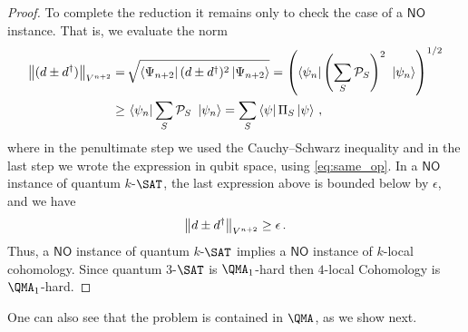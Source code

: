 \documentclass[11pt]{article}
\numberwithin{equation}{section}
\def\cP{{\cal P}}
\newcommand{\no}{\mathsf{NO}}
\newcommand\equ[1] {\begin{equation}#1\end{equation}}
\newcommand\eqss[1] {\begin{align}\begin{split}#1\end{split}\end{align}}
\renewcommand\( {\left(}
\renewcommand\) {\right)}
\begin{document}
\begin{proof}
To complete the reduction it remains only to check the case of a $\no$ instance. That is, we evaluate the norm
\eqss{
\norm{(d\pm d^{\dagger})}_{V^{n+2}}=\,& \sqrt{ \bra{\Psi_{n+2}}(d\pm d^{\dagger})^{2} \ket{\Psi_{n+2}}}= \left( \bra{\psi_{n}} \left(\sum_{S}\cP_{S}\right)^{2}\ \ket{\psi_{n}}\right)^{1/2} \\
\geq \,&  \bra{\psi_{n}} \sum_{S}\cP_{S}\ \ket{\psi_{n}}=\sum_{S}\bra{\psi}\Pi_{S}\ket{\psi}\,,
}
where in the penultimate step we used the Cauchy–Schwarz inequality and in the last step we wrote the expression in qubit space, using \eqref{eq:same_op}. In a $\no$ instance of {\sc  quantum $k$-$\SAT$}, the last expression above is bounded below by $\epsilon$, and we have
\equ{
\norm{d\pm d^{\dagger}}_{V^{n+2}}\geq \epsilon\,.
}
Thus, a $\no$ instance of {\sc  quantum $k$-$\SAT$} implies a $\no$ instance of {\sc $k$-local cohomology}. Since {\sc  quantum $3$-$\SAT$} is $\QMA_{1}$-hard \cite{Gosset_2013} then {\sc $4$-local Cohomology} is $\QMA_{1}$-hard.  

\end{proof}

\noindent One can also see that the problem is contained in  $\QMA$, as we show next. 
\end{document}
